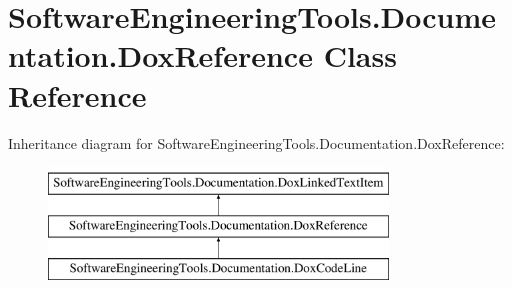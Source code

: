 \hypertarget{class_software_engineering_tools_1_1_documentation_1_1_dox_reference}{\section{Software\+Engineering\+Tools.\+Documentation.\+Dox\+Reference Class Reference}
\label{class_software_engineering_tools_1_1_documentation_1_1_dox_reference}
}
Inheritance diagram for Software\+Engineering\+Tools.\+Documentation.\+Dox\+Reference\+:\begin{figure}[H]
\begin{center}
\leavevmode
\includegraphics[height=3.000000cm]{class_software_engineering_tools_1_1_documentation_1_1_dox_reference}
\end{center}
\end{figure}
